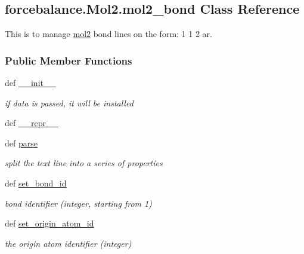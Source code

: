 \hypertarget{classforcebalance_1_1Mol2_1_1mol2__bond}{\subsection{forcebalance.\-Mol2.\-mol2\-\_\-bond \-Class \-Reference}
\label{classforcebalance_1_1Mol2_1_1mol2__bond}
}


\-This is to manage \hyperlink{classforcebalance_1_1Mol2_1_1mol2}{mol2} bond lines on the form\-: 1 1 2 ar.  


\subsubsection*{\-Public \-Member \-Functions}
\begin{DoxyCompactItemize}
\item 
def \hyperlink{classforcebalance_1_1Mol2_1_1mol2__bond_a093622f1fda304a18ee25b232ba2f998}{\-\_\-\-\_\-init\-\_\-\-\_\-}
\begin{DoxyCompactList}\small\item\em if data is passed, it will be installed \end{DoxyCompactList}\item 
def \hyperlink{classforcebalance_1_1Mol2_1_1mol2__bond_adb17d4278c0063cf557807b77f2cb3e1}{\-\_\-\-\_\-repr\-\_\-\-\_\-}
\item 
def \hyperlink{classforcebalance_1_1Mol2_1_1mol2__bond_a66ca9cb935bd3a9a1f41335d85d39b2f}{parse}
\begin{DoxyCompactList}\small\item\em split the text line into a series of properties \end{DoxyCompactList}\item 
def \hyperlink{classforcebalance_1_1Mol2_1_1mol2__bond_a7e8bcec38c5dd62a0c672ad855388ce0}{set\-\_\-bond\-\_\-id}
\begin{DoxyCompactList}\small\item\em bond identifier (integer, starting from 1) \end{DoxyCompactList}\item 
def \hyperlink{classforcebalance_1_1Mol2_1_1mol2__bond_a6116c2ff70b27afcd3acd507861496ae}{set\-\_\-origin\-\_\-atom\-\_\-id}
\begin{DoxyCompactList}\small\item\em the origin atom identifier (integer) \end{DoxyCompactList}\item 

\end{DoxyCompactItemize}
